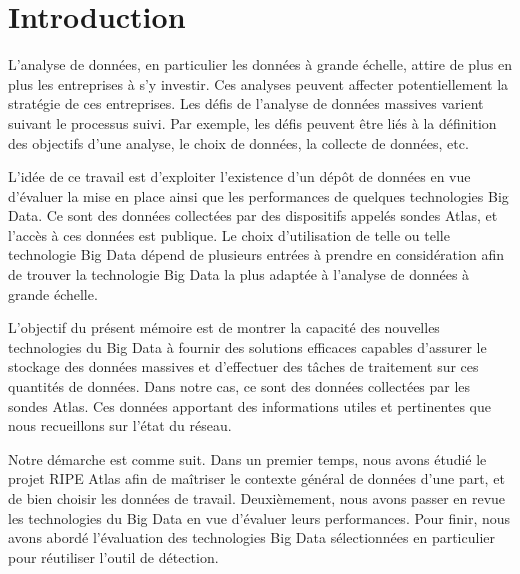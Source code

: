 \chapter*{Introduction}


L'analyse de données, en particulier les données à grande échelle, attire de plus en plus les entreprises à s'y investir.  Ces analyses peuvent affecter potentiellement la stratégie de ces entreprises. 
Les défis de l'analyse de données massives varient suivant le processus suivi. Par exemple, les défis peuvent être liés à la définition  des objectifs d'une analyse, le choix de données, la collecte de données, etc.


L'idée de ce travail est  d'exploiter l'existence d'un dépôt de données en vue d'évaluer la mise en place ainsi que les performances de quelques technologies Big Data.
Ce sont des données  collectées par des dispositifs appelés sondes Atlas,  et  l'accès à ces données est publique. 
 Le choix d'utilisation de telle ou telle technologie Big Data dépend de plusieurs entrées à prendre en considération afin de trouver la technologie Big Data la plus adaptée à l'analyse de données à grande échelle.


L'objectif du présent mémoire est de montrer la capacité des nouvelles technologies du Big Data à fournir des solutions efficaces capables d'assurer le stockage des données massives et d'effectuer des tâches de traitement sur ces quantités de données. Dans notre cas, ce sont des données 
collectées par les sondes Atlas. Ces  données apportant des informations utiles et pertinentes que nous recueillons sur l'état du réseau.



Notre démarche est comme suit. Dans un premier temps, nous avons étudié le projet RIPE Atlas afin de maîtriser le contexte général de données d'une part, et de bien choisir les données de travail. Deuxièmement, nous avons passer en revue les technologies du Big Data en vue d'évaluer leurs performances. Pour finir, nous avons abordé l'évaluation des technologies Big Data sélectionnées en particulier pour réutiliser l'outil de détection.




